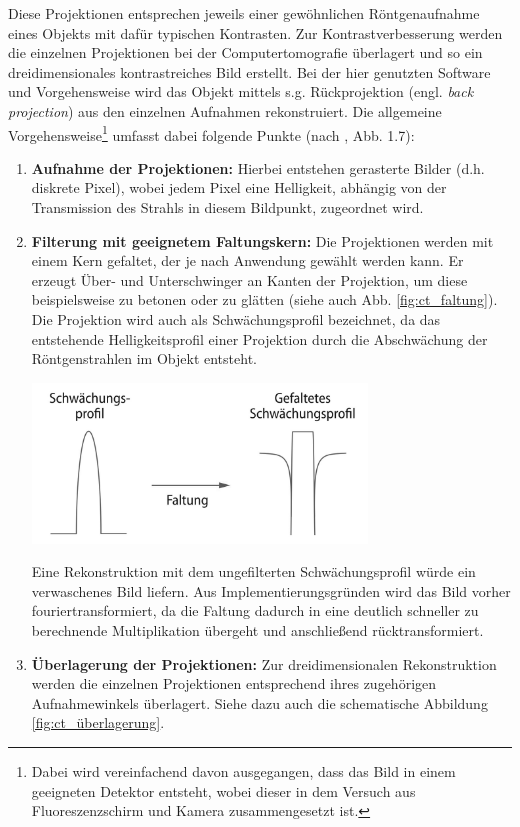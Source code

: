 \documentclass[11pt, a4paper]{article}
\numberwithin{equation}{section}
\begin{document}
Diese Projektionen entsprechen jeweils einer gewöhnlichen Röntgenaufnahme eines Objekts mit dafür typischen Kontrasten.
Zur Kontrastverbesserung werden die einzelnen Projektionen bei der Computertomografie überlagert und so ein dreidimensionales kontrastreiches Bild erstellt.
Bei der hier genutzten Software und Vorgehensweise wird das Objekt mittels s.g. Rückprojektion (engl. \emph{back projection}) aus den einzelnen Aufnahmen rekonstruiert.
Die allgemeine Vorgehensweise\footnote{Dabei wird vereinfachend davon ausgegangen, dass das Bild in einem geeigneten Detektor entsteht, wobei dieser in dem Versuch aus Fluoreszenzschirm und Kamera zusammengesetzt ist.} umfasst dabei folgende Punkte (nach \cite{kalender}, Abb. 1.7):
\begin{enumerate}
	\item \textbf{Aufnahme der Projektionen:} Hierbei entstehen gerasterte Bilder (d.h. diskrete Pixel), wobei jedem Pixel eine Helligkeit, abhängig von der Transmission des Strahls in diesem Bildpunkt, zugeordnet wird.
	\item \textbf{Filterung mit geeignetem Faltungskern:} Die Projektionen werden mit einem Kern gefaltet, der je nach Anwendung gewählt werden kann.
	Er erzeugt Über- und Unterschwinger an Kanten der Projektion, um diese beispielsweise zu betonen oder zu glätten (siehe auch Abb. \ref{fig:ct_faltung}).
	Die Projektion wird auch als Schwächungsprofil bezeichnet, da das entstehende Helligkeitsprofil einer Projektion durch die Abschwächung der Röntgenstrahlen im Objekt entsteht. 
	\begin{minipage}[ht]{\linewidth}
		\centering
	   \includegraphics[width=0.7\textwidth]{./figures/ct/faltung.jpg}
		\label{fig:ct_faltung}
		\medskip
	\end{minipage}
	Eine Rekonstruktion mit dem ungefilterten Schwächungsprofil würde ein verwaschenes Bild liefern.
	Aus Implementierungsgründen wird das Bild vorher fouriertransformiert, da die Faltung dadurch in eine deutlich schneller zu berechnende Multiplikation übergeht und anschließend rücktransformiert.
	\item \textbf{Überlagerung der Projektionen:} Zur dreidimensionalen Rekonstruktion werden die einzelnen Projektionen entsprechend ihres zugehörigen Aufnahmewinkels überlagert.
	Siehe dazu auch die schematische Abbildung \ref{fig:ct_überlagerung}.
	

\end{enumerate}
\end{document}
